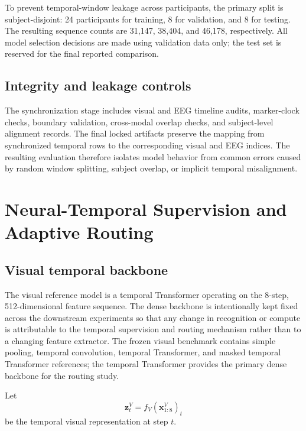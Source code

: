 \documentclass[runningheads]{llncs}
\begin{document}
To prevent temporal-window leakage across participants, the primary split is subject-disjoint: 24 participants for training, 8 for validation, and 8 for testing. The resulting sequence counts are 31,147, 38,404, and 46,178, respectively. All model selection decisions are made using validation data only; the test set is reserved for the final reported comparison.

\subsection{Integrity and leakage controls}

The synchronization stage includes visual and EEG timeline audits, marker-clock checks, boundary validation, cross-modal overlap checks, and subject-level alignment records. The final locked artifacts preserve the mapping from synchronized temporal rows to the corresponding visual and EEG indices. The resulting evaluation therefore isolates model behavior from common errors caused by random window splitting, subject overlap, or implicit temporal misalignment.

{\small}

\section{Neural-Temporal Supervision and Adaptive Routing}

\subsection{Visual temporal backbone}

The visual reference model is a temporal Transformer operating on the 8-step, 512-dimensional feature sequence. The dense backbone is intentionally kept fixed across the downstream experiments so that any change in recognition or compute is attributable to the temporal supervision and routing mechanism rather than to a changing feature extractor. The frozen visual benchmark contains simple pooling, temporal convolution, temporal Transformer, and masked temporal Transformer references; the temporal Transformer provides the primary dense backbone for the routing study.

Let
\begin{equation}
\mathbf{z}^{V}_{t}=f_{V}(\mathbf{x}^{V}_{1:8})_{t}
\end{equation}
be the temporal visual representation at step $t$.
\end{document}
